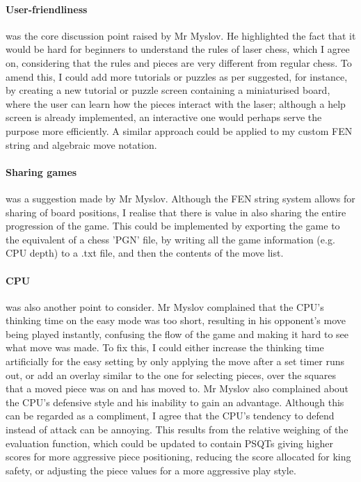 \documentclass[../main/main.tex]{subfiles}
\begin{document}
\paragraph{User-friendliness} was the core discussion point raised by Mr Myslov. He highlighted the fact that it would be hard for beginners to understand the rules of laser chess, which I agree on, considering that the rules and pieces are very different from regular chess.  To amend this, I could add more tutorials or puzzles as per suggested, for instance, by creating a new tutorial or puzzle screen containing a miniaturised board, where the user can learn how the pieces interact with the laser; although a help screen is already implemented, an interactive one would perhaps serve the purpose more efficiently. A similar approach could be applied to my custom FEN string and algebraic move notation.

\paragraph{Sharing games} was a suggestion made by Mr Myslov. Although the FEN string system allows for sharing of board positions, I realise that there is value in also sharing the entire progression of the game. This could be implemented by exporting the game to the equivalent of a chess 'PGN' file, by writing all the game information (e.g. CPU depth) to a .txt file, and then the contents of the move list.

\paragraph{CPU} was also another point to consider. Mr Myslov complained that the CPU's thinking time on the easy mode was too short, resulting in his opponent's move being played instantly, confusing the flow of the game and making it hard to see what move was made. To fix this, I could either increase the thinking time artificially for the easy setting by only applying the move after a set timer runs out, or add an overlay similar to the one for selecting pieces, over the squares that a moved piece was on and has moved to. Mr Myslov also complained about the CPU's defensive style and his inability to gain an advantage. Although this can be regarded as a compliment, I agree that the CPU's tendency to defend instead of attack can be annoying. This results from the relative weighing of the evaluation function, which could be updated to contain PSQTs giving higher scores for more aggressive piece positioning, reducing the score allocated for king safety, or adjusting the piece values for a more aggressive play style.
\end{document}
